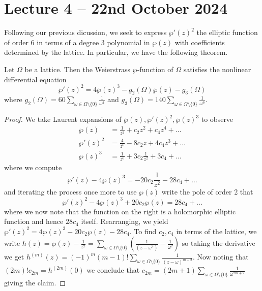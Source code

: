 \section{Lecture 4 -- 22nd October 2024}\label{sec: lecture 4}
Following our previous dicussion, we seek to express $\wp'(z)^{2}$ the elliptic function of order 6 in terms of a degree 3 polynomial in $\wp(z)$ with coefficients determined by the lattice. In particular, we have the following theorem. 
\begin{theorem}\label{thm: Weierstrass differential equation}
    Let $\Omega$ be a lattice. Then the Weierstrass $\wp$-function of $\Omega$ satisfies the nonlinear differential equation
    \begin{equation}\label{eqn: Weierstrass differential equation}
        \wp'(z)^{2}=4\wp(z)^{3}-g_{2}(\Omega)\wp(z)-g_{3}(\Omega)
    \end{equation}
    where $g_{2}(\Omega)=60\sum_{\omega\in\Omega\setminus\{0\}}\frac{1}{\omega^{4}}$ and $g_{3}(\Omega)=140\sum_{\omega\in\Omega\setminus\{0\}}\frac{1}{\omega^{6}}$.
\end{theorem}
\begin{proof}
    We take Laurent expansions of $\wp(z),\wp'(z)^{2},\wp(z)^{3}$ to observe 
    \begin{align*}
        \wp(z) &= \frac{1}{z^{2}}+c_{2}z^{2}+c_{4}z^{4}+\dots \\
        \wp'(z)^{2} &= \frac{4}{z^{6}}-8c_{2}z+4c_{4}z^{3}+\dots \\
        \wp(z)^{3} &= \frac{1}{z^{6}} +3c_{2}\frac{1}{z^{2}} + 3c_{4}+\dots
    \end{align*}
    where we compute 
    $$\wp'(z)-4\wp(z)^{3}=-20c_{2}\frac{1}{z^{2}}-28c_{4}+\dots$$
    and iterating the process once more to use $\wp(z)$ write the pole of order 2 that 
    $$\wp'(z)^{2}-4\wp(z)^{3}+20c_{2}\wp(z)=28c_{4}+\dots$$
    where we now note that the function on the right is a holomorphic elliptic function and hence $28c_{4}$ itself. Rearranging, we yield $\wp'(z)^{2}=4\wp(z)^{3}-20c_{2}\wp(z)-28c_{4}$. To find $c_{2},c_{4}$ in terms of the lattice, we write $h(z)=\wp(z)-\frac{1}{z^{2}}=\sum_{\omega\in\Omega\setminus\{0\}}\left(\frac{1}{(z-\omega^{2})}-\frac{1}{\omega^{2}}\right)$ so taking the derivative we get $h^{(m)}(z)=(-1)^{m}(m-1)!\sum_{\omega\in\Omega\setminus\{0\}}\frac{1}{(z-\omega)^{m+2}}$. Now noting that $(2m)!c_{2m}=h^{(2m)}(0)$ we conclude that $c_{2m}=(2m+1)\sum_{\omega\in\Omega\setminus\{0\}}\frac{1}{\omega^{2m+2}}$ giving the claim. 
\end{proof}
